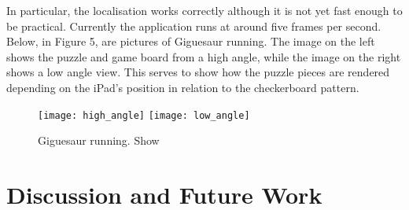 \documentclass{article}
\begin{document}
In particular, the localisation works correctly although it is not yet fast enough to be practical. Currently the application runs at around five frames per second. Below, in Figure 5, are pictures of Giguesaur running. The image on the left shows the puzzle and game board from a high angle, while the image on the right shows a low angle view. This serves to show how the puzzle pieces are rendered depending on the iPad's position in relation to the checkerboard pattern. 


\begin{figure}[H]
\begin{center}
\texttt{[image: high\_angle]}
\texttt{[image: low\_angle]}
\caption{Giguesaur running. Show}
\end{center}
\end{figure}


\section{Discussion and Future Work}



\begin{comment}
The main limitation of my current implementation of camera localisation is the use of the findChessboardCorners function to locate the relevant features in an image. This function is subject to the limitation that the whole chessboard pattern must be in view of the camera or none of the internal corners' image-space coordinates are given. Without those image-space coordinates the pose estimation algorithm cannot be executed and therefore the camera's location cannot be determined. This effectively limits the puzzle to being played on a tabletop without anyone obscuring the board from another player's iPad, which is at odds with our vision of how the game should be played.

It would be nice to develop a marker tracking system that doesn't require that the whole marker (or all markers) be in view at one time, and if at all possible allow for a marker to be partially obscured without loss of camera location. There has been some research on the topic of partial marker occlusion \cite{occlusion} and I would like to be able to implement a similar system. 
\end{comment}



\nocite{*}


\end{document}
